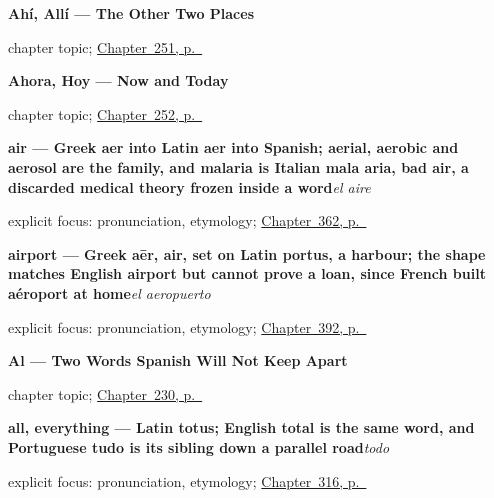 \noindent\begin{minipage}[t]{\linewidth}
\raggedright
\textbf{Ahí, Allí --- The Other Two Places}\par
\footnotesize chapter topic; \hyperref[ch:ahi-alli]{Chapter~251, p.~\pageref*{ch:ahi-alli}}
\end{minipage}\par\smallskip

\noindent\begin{minipage}[t]{\linewidth}
\raggedright
\textbf{Ahora, Hoy --- Now and Today}\par
\footnotesize chapter topic; \hyperref[ch:ahora-hoy]{Chapter~252, p.~\pageref*{ch:ahora-hoy}}
\end{minipage}\par\smallskip

\noindent\begin{minipage}[t]{\linewidth}
\raggedright
\textbf{air — Greek aer into Latin aer into Spanish; aerial, aerobic and aerosol are the family, and malaria is Italian mala aria, bad air, a discarded medical theory frozen inside a word}\enspace\emph{el aire}\par
\footnotesize explicit focus: pronunciation, etymology; \hyperref[ch:la-tierra-y-el-mar]{Chapter~362, p.~\pageref*{ch:la-tierra-y-el-mar}}
\end{minipage}\par\smallskip

\noindent\begin{minipage}[t]{\linewidth}
\raggedright
\textbf{airport — Greek aēr, air, set on Latin portus, a harbour; the shape matches English airport but cannot prove a loan, since French built aéroport at home}\enspace\emph{el aeropuerto}\par
\footnotesize explicit focus: pronunciation, etymology; \hyperref[ch:el-aeropuerto-y-las-vacaciones]{Chapter~392, p.~\pageref*{ch:el-aeropuerto-y-las-vacaciones}}
\end{minipage}\par\smallskip

\noindent\begin{minipage}[t]{\linewidth}
\raggedright
\textbf{Al --- Two Words Spanish Will Not Keep Apart}\par
\footnotesize chapter topic; \hyperref[ch:al]{Chapter~230, p.~\pageref*{ch:al}}
\end{minipage}\par\smallskip

\noindent\begin{minipage}[t]{\linewidth}
\raggedright
\textbf{all, everything — Latin totus; English total is the same word, and Portuguese tudo is its sibling down a parallel road}\enspace\emph{todo}\par
\footnotesize explicit focus: pronunciation, etymology; \hyperref[ch:nunca-y-siempre]{Chapter~316, p.~\pageref*{ch:nunca-y-siempre}}
\end{minipage}\par\smallskip

